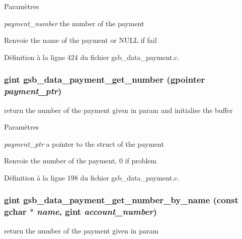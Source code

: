 \begin{DoxyParams}{Paramètres}
\item[{\em payment\_\-number}]the number of the payment\end{DoxyParams}
\begin{DoxyReturn}{Renvoie}
the name of the payment or NULL if fail 
\end{DoxyReturn}


Définition à la ligne 424 du fichier gsb\_\-data\_\-payment.c.

\subsubsection[{gsb\_\-data\_\-payment\_\-get\_\-number}]{\setlength{\rightskip}{0pt plus 5cm}gint gsb\_\-data\_\-payment\_\-get\_\-number (gpointer {\em payment\_\-ptr})}\label{gsb__data__payment_8h_ad8738991cf8066d32f2a9a76f465f941}
return the number of the payment given in param and initialise the buffer


\begin{DoxyParams}{Paramètres}
\item[{\em payment\_\-ptr}]a pointer to the struct of the payment\end{DoxyParams}
\begin{DoxyReturn}{Renvoie}
the number of the payment, 0 if problem 
\end{DoxyReturn}


Définition à la ligne 198 du fichier gsb\_\-data\_\-payment.c.

\subsubsection[{gsb\_\-data\_\-payment\_\-get\_\-number\_\-by\_\-name}]{\setlength{\rightskip}{0pt plus 5cm}gint gsb\_\-data\_\-payment\_\-get\_\-number\_\-by\_\-name (const gchar $\ast$ {\em name}, \/  gint {\em account\_\-number})}\label{gsb__data__payment_8h_a84385c444819731fbdddb56c553ed2e0}
return the number of the payment given in param


